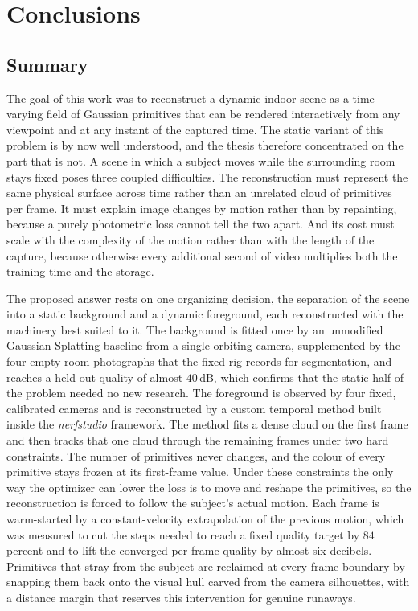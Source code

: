 \chapter{Conclusions}
\label{ch:conclusions}

\section{Summary}
\label{sec:conclusions-summary}

The goal of this work was to reconstruct a dynamic indoor scene as a time-varying
field of Gaussian primitives that can be rendered interactively from any viewpoint
and at any instant of the captured time. The static variant of this problem is by
now well understood, and the thesis therefore concentrated on the part that is not.
A scene in which a subject moves while the surrounding room stays fixed poses three
coupled difficulties. The reconstruction must represent the same physical surface
across time rather than an unrelated cloud of primitives per frame. It must explain
image changes by motion rather than by repainting, because a purely photometric loss
cannot tell the two apart. And its cost must scale with the complexity of the motion
rather than with the length of the capture, because otherwise every additional
second of video multiplies both the training time and the storage.

The proposed answer rests on one organizing decision, the separation of the scene
into a static background and a dynamic foreground, each reconstructed with the
machinery best suited to it. The background is fitted once by an unmodified
Gaussian Splatting baseline from a single orbiting camera, supplemented by the four
empty-room photographs that the fixed rig records for segmentation, and reaches a
held-out quality of almost $40$\,dB, which confirms that the static half of the
problem needed no new research. The foreground is observed by four fixed, calibrated cameras and
is reconstructed by a custom temporal method built inside the \emph{nerfstudio} framework.
The method fits a dense cloud on the first frame and then tracks that one cloud
through the remaining frames under two hard constraints. The number of primitives
never changes, and the colour of every primitive stays frozen at its first-frame
value. Under these constraints the only way the optimizer can lower the loss is to
move and reshape the primitives, so the reconstruction is forced to follow the
subject's actual motion. Each frame is warm-started by a constant-velocity
extrapolation of the previous motion, which was measured to cut the steps needed to
reach a fixed quality target by $84$ percent and to lift the converged per-frame
quality by almost six decibels. Primitives that stray from the subject are
reclaimed at every frame boundary by snapping them back onto the visual hull carved
from the camera silhouettes, with a distance margin that reserves this intervention
for genuine runaways.

